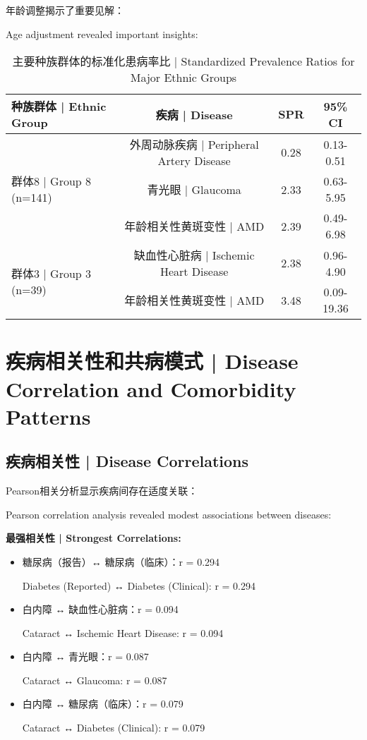 \documentclass[12pt,a4paper]{article}
\begin{document}
年龄调整揭示了重要见解：

Age adjustment revealed important insights:

\begin{table}[H]
\centering
\caption{主要种族群体的标准化患病率比 | Standardized Prevalence Ratios for Major Ethnic Groups}
\begin{tabular}{@{}lccc@{}}
\toprule
\textbf{种族群体 | Ethnic Group} & \textbf{疾病 | Disease} & \textbf{SPR} & \textbf{95\% CI} \\
\midrule
\multirow{3}{*}{群体8 | Group 8 (n=141)} & 外周动脉疾病 | Peripheral Artery Disease & 0.28 & 0.13-0.51 \\
& 青光眼 | Glaucoma & 2.33 & 0.63-5.95 \\
& 年龄相关性黄斑变性 | AMD & 2.39 & 0.49-6.98 \\
\midrule
\multirow{2}{*}{群体3 | Group 3 (n=39)} & 缺血性心脏病 | Ischemic Heart Disease & 2.38 & 0.96-4.90 \\
& 年龄相关性黄斑变性 | AMD & 3.48 & 0.09-19.36 \\
\bottomrule
\end{tabular}
\end{table}

\section{疾病相关性和共病模式 | Disease Correlation and Comorbidity Patterns}

\subsection{疾病相关性 | Disease Correlations}

Pearson相关分析显示疾病间存在适度关联：

Pearson correlation analysis revealed modest associations between diseases:

\textbf{最强相关性 | Strongest Correlations:}
\begin{itemize}
    \item 糖尿病（报告）↔ 糖尿病（临床）：r = 0.294
    
    Diabetes (Reported) ↔ Diabetes (Clinical): r = 0.294
    
    \item 白内障 ↔ 缺血性心脏病：r = 0.094
    
    Cataract ↔ Ischemic Heart Disease: r = 0.094
    
    \item 白内障 ↔ 青光眼：r = 0.087
    
    Cataract ↔ Glaucoma: r = 0.087
    
    \item 白内障 ↔ 糖尿病（临床）：r = 0.079
    
    Cataract ↔ Diabetes (Clinical): r = 0.079
\end{itemize}
\end{document}
